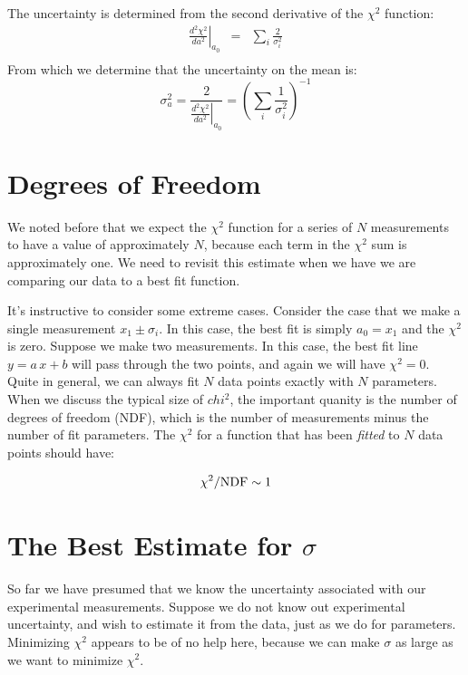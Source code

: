 \documentclass[12pt,oneside]{book}
\begin{document}
The uncertainty is determined from the second derivative of the $\chi^2$ function:
\begin{eqnarray*}
\left.\frac{d^2\chi^2}{da^2}\right|_{a_0} &=& \sum_i \frac{2}{\sigma_i^2}\\
\end{eqnarray*}
From which we determine that the uncertainty on the mean is:
\begin{displaymath}
\sigma^2_a = \frac{2}{\left. \frac{d^2\chi^2}{da^2} \right|_{a_0}} = \left( \sum_i \frac{1}{\sigma_i^2} \right)^{-1}
\end{displaymath}

\section{Degrees of Freedom}

We noted before that we expect the $\chi^2$ function for a series of
$N$ measurements to have a value of approximately $N$, because each
term in the $\chi^2$ sum is approximately one.  We need to revisit
this estimate when we have we are comparing our data to a best fit
function.

It's instructive to consider some extreme cases.  Consider the case
that we make a single measurement $x_1 \pm \sigma_i$.  In this case,
the best fit is simply $a_0 = x_1$ and the $\chi^2$ is zero.  Suppose
we make two measurements.  In this case, the best fit line $y = a\,x +
b$ will pass through the two points, and again we will have
$\chi^2=0$.  Quite in general, we can always fit $N$ data points
exactly with $N$ parameters.  When we discuss the typical size of
$chi^2$, the important quanity is the number of degrees of freedom
(NDF), which is the number of measurements minus the number of fit
parameters.  The $\chi^2$ for a function that has been {\em fitted} to
$N$ data points should have:

\begin{displaymath}
\chi^2 / {\rm NDF}  \sim 1
\end{displaymath}

\section{The Best Estimate for $\sigma$}
\label{sec:estsig}

So far we have presumed that we know the uncertainty associated with
our experimental measurements.  Suppose we do not know out
experimental uncertainty, and wish to estimate it from the data, just
as we do for parameters.  Minimizing $\chi^2$ appears to be of no help
here, because we can make $\sigma$ as large as we want to minimize
$\chi^2$.
\end{document}
